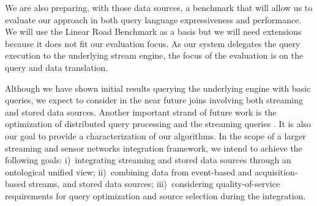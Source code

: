 We are also preparing, with those data sources, a benchmark that will allow us to evaluate our approach in both query language expressiveness and performance. We will use the Linear Road Benchmark\cite{Arasu2004} as a basis but we will need extensions because it does not fit our evaluation focus. As our system delegates the query execution to the underlying stream engine, the focus of the evaluation is on the query and data translation.  

Although we have shown initial results querying the underlying \snee engine with basic queries, we expect to consider in the near future joins involving both streaming and stored data sources.
Another important strand of future work is the optimization of distributed query processing \cite{Kossmann_00} and the streaming queries \cite{Abadi_2005,Galpin_09}.
It is also our goal to provide a characterization of our algorithms. 
In the scope of a larger streaming and sensor networks integration framework, we intend to achieve the following goals: %
i)~integrating streaming and stored data sources through an ontological unified view; %
ii)~combining data from event-based and acquisition-based streams, and stored data sources; %
iii)~considering quality-of-service requirements for query optimization and source selection during the integration.




